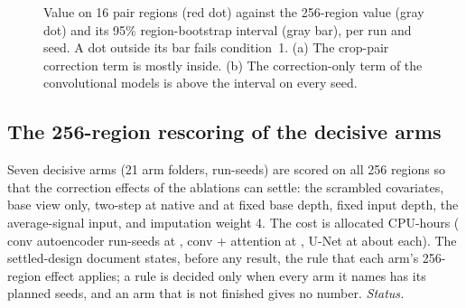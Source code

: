 \documentclass[pdflatex,sn-mathphys-num]{sn-jnl}
\newcommand{\lit}[1]{#1}
\newcommand{\cl}[1]{#1}
\begin{document}
\begin{figure}[!htbp]
\centering
{}
\caption{\cl{Value on \lit{16} pair regions (red dot) against the \lit{256}-region value (gray dot) and its \lit{95}\% region-bootstrap interval (gray bar), per run and seed. A dot outside its bar fails condition~\lit{1}. (a) The crop-pair correction term is mostly inside. (b) The correction-only term of the convolutional models is above the interval on every seed.}}\label{fig:region}
\end{figure}

\subsection{The \lit{256}-region rescoring of the decisive arms}\label{sec:rescore}

\cl{Seven decisive arms (\lit{21} arm folders, \rescoreSeeds{} run-seeds) are scored on all \lit{256} regions so that the correction effects of the ablations can settle: the scrambled covariates, base view only, two-step at native and at fixed base depth, fixed input depth, the average-signal input, and imputation weight \lit{4}. The cost is \rescoreCost{} allocated CPU-hours (\nRunsAE{} conv autoencoder run-seeds at \costAE{}, \nRunsAT{} conv + attention at \costAT{}, \nRunsUN{} U-Net at about \costUN{} each). The settled-design document states, before any result, the rule that each arm's \lit{256}-region effect applies; a rule is decided only when every arm it names has its planned seeds, and an arm that is not finished gives no number. \textit{Status.} \rescoreStatus{}}
\end{document}

